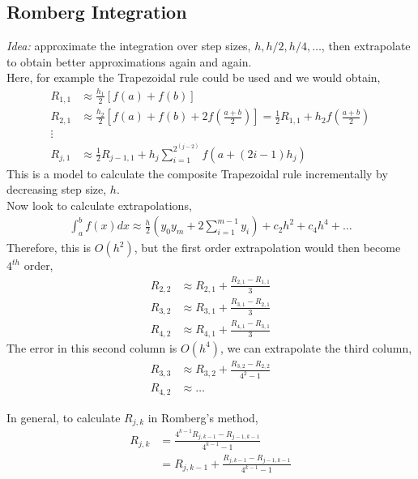 \documentclass[11pt,a4paper]{report}
\begin{document}
	\subsection{Romberg Integration}
	\textit{Idea:} approximate the integration over step sizes, $h,h/2,h/4,\dots$, then extrapolate to obtain better approximations again and again. \\
	
	Here, for example the Trapezoidal rule could be used and we would obtain,
	\begin{align}
		R_{1,1} &\approx \frac{h_1}{2} \left[ f(a) + f(b) \right] \\
		R_{2,1} &\approx \frac{h_2}{2} \left[ f(a) + f(b) + 2 f\left(\frac{a+b}{2}\right)\right] =\frac{1}{2} R_{1,1} + h_2 f\left(\frac{a+b}{2}\right)\\
		\vdots & \\
		R_{j,1} &\approx \frac{1}{2} R_{j-1,1} + h_j \sum_{i=1}^{2^{(j-2)}} f\left(a+(2i-1)h_j\right) 
	\end{align}
	This is a model to calculate the composite Trapezoidal rule incrementally by decreasing step size, $h$. \\
	
	Now look to calculate extrapolations,
	\begin{align}
		\int_a^b f(x) dx \approx \frac{h}{2} \left(y_0 y_m + 2 \sum_{i=1}^{m-1}y_i\right) + c_2h^2 +c_4h^4 + \dots
	\end{align}
	Therefore, this is $O(h^2)$, but the first order extrapolation would then become $4^{th}$ order,
	\begin{align}
	 R_{2,2} &\approx R_{2,1} + \frac{R_{2,1}-R_{1,1}}{3} \\
	 R_{3,2} &\approx R_{3,1} + \frac{R_{3,1}-R_{2,1}}{3} \\
	 R_{4,2} &\approx R_{4,1} + \frac{R_{4,1}-R_{3,1}}{3} 
	\end{align}
	The error in this second column is $O(h^4)$, we can extrapolate the third column,
	\begin{align}
		R_{3,3} &\approx R_{3,2} + \frac{R_{3,2} - R_{2,2}}{4^2-1} \\
		R_{4,2} &\approx \dots
	\end{align}
	
	In general, to calculate $R_{j,k}$ in Romberg's method, 
	\begin{align}
		R_{j,k} &= \frac{4^{k-1} R_{j,k-1} - R_{j-1,k-1}}{4^{k-1} - 1} \\
				&= R_{j,k-1} + \frac{R_{j,k-1} - R_{j-1,k-1}}{4^{k-1} - 1}
	\end{align} 
	
\end{document}
